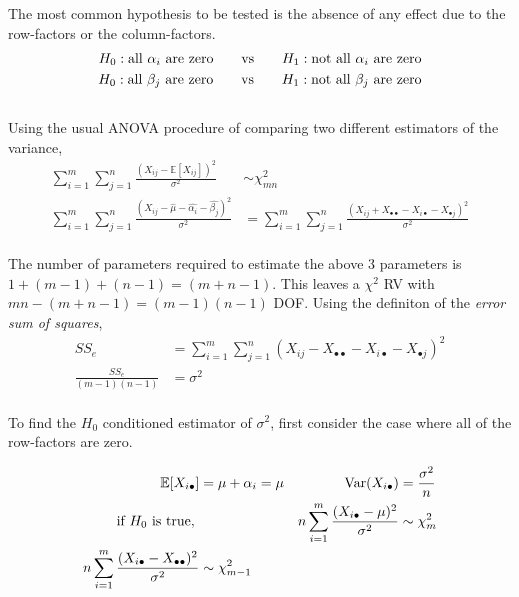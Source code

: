 The most common hypothesis to be tested is the absence of any effect due to the row-factors or the column-factors. \\

\begin{align}
	H_0 : \text{all $ \alpha_i $ are zero} \qquad \text{vs} \qquad H_1 : \text{not all $ \alpha_i $ are zero} \nonumber \\
	H_0 : \text{all $ \beta_j $ are zero} \qquad \text{vs} \qquad H_1 : \text{not all $ \beta_j $ are zero} \nonumber
\end{align}\\

Using the usual ANOVA procedure of comparing two different estimators of the variance, \\

\begin{align}
	\sum\limits_{i = 1}^{m} \sum\limits_{j = 1}^{n} \frac{(X_{ij} - \mathbb{E}[X_{ij}])^2}{\sigma^2} &\sim \chi^2_{mn} \nonumber \\
	\sum\limits_{i = 1}^{m} \sum\limits_{j = 1}^{n} \frac{(X_{ij} - \widehat{\mu} - \widehat{\alpha_i} - \widehat{\beta_j})^2}{\sigma^2} &= \sum\limits_{i = 1}^{m} \sum\limits_{j = 1}^{n} \frac{(X_{ij} + X_{\bullet \bullet} - X_{i \bullet} - X_{\bullet j})^2}{\sigma^2}
\end{align}\\

The number of parameters required to estimate the above 3 parameters is $ 1 + (m-1) + (n-1) = (m+n-1)$. This leaves a $ \chi^2 $ RV with $ mn - (m+n-1) = (m-1)(n-1) $ DOF. Using the definiton of the \textit{error sum of squares},\\

\begin{align}
	SS_e &=	\sum\limits_{i = 1}^{m} \sum\limits_{j = 1}^{n} (X_{ij} - X_{\bullet \bullet} - X_{i \bullet} - X_{\bullet j})^2\\
	\frac{SS_e}{(m-1)(n-1)} &= \sigma^2
\end{align}\\

To find the $ H_0 $ conditioned estimator of $ \sigma^2 $, first consider the case where all of the row-factors are zero.

\begin{align}
	\mathbb{E}[X_{i\bullet}] &= \mu + \alpha_i = \mu & \mathrm{Var}(X_{i\bullet}) &= \frac{\sigma^2}{n} \nonumber \\
	\text{if $ H_0 $ is true, } && n\sum\limits_{i = 1}^{m} \frac{(X_{i\bullet}  - \mu)^2}{\sigma^2} &\sim \chi^2_{m} \\
	n\sum\limits_{i = 1}^{m} \frac{(X_{i\bullet}  - X_{\bullet \bullet})^2}{\sigma^2} &\sim \chi^2_{m-1}
\end{align}\\

